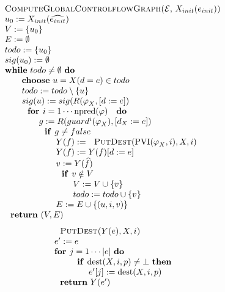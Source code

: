 \begin{equation*}
\begin{tabular}{l}
\textsc{ComputeGlobalControlflowGraph(}$\mathcal{E}$, $X_{init}(e_{init})$%
\textsc{)} \\ 
$u_{0}:=X_{init}(\widehat{e_{init}})$ \\ 
$V:=\{u_{0}\}$ \\ 
$E:=\emptyset $ \\ 
$todo:=\{u_{0}\}$ \\ 
$sig(u_{0}):=\emptyset $ \\ 
\textbf{while} $todo\neq \emptyset $ \textbf{do} \\ 
$\qquad $\textbf{choose} $u=X(d=e)\in todo$ \\ 
$\qquad todo:=todo\setminus \{u\}$ \\ 
$\qquad sig(u):=sig(R(\varphi _{X},[d:=e])$ \\ 
$\qquad \text{\textbf{for }}i=1\cdots \mathrm{npred}(\varphi )\text{ \textbf{%
do}}$ \\ 
$\qquad \qquad g:=R(guard^{i}(\varphi _{X}),[d_{X}:=e])$ \\ 
$\qquad \qquad \text{\textbf{if }}g\neq false$ \\ 
$\qquad \qquad \qquad Y(f):=\text{\textsc{PutDest}}(\mathrm{PVI}(\varphi
_{X},i),X,i)$ \\ 
$\qquad \qquad \qquad Y(f):=Y(f)[d:=e]$ \\ 
$\qquad \qquad \qquad v:=Y(\widehat{f})$ \\ 
$\qquad \qquad \qquad \text{\textbf{if }}v\notin V$ \\ 
$\qquad \qquad \qquad \qquad V:=V\cup \{v\}$ \\ 
$\qquad \qquad \qquad \qquad todo:=todo\cup \{v\}$ \\ 
$\qquad \qquad \qquad E:=E\cup \{(u,i,v)\}$ \\ 
$\text{\textbf{return} }(V,E)$%
\end{tabular}%
\end{equation*}%
\begin{equation*}
\begin{tabular}{l}
$\text{\textsc{PutDest}}$\textsc{(}$Y(e),X,i$\textsc{)} \\ 
$e^{\prime }:=e$ \\ 
\textbf{for }$j=1\cdots \left\vert e\right\vert $ \textbf{do} \\ 
$\qquad \text{\textbf{if }}\mathrm{dest}(X,i,p)\neq \bot $ \textbf{then} \\ 
$\qquad \qquad e^{\prime }[j]:=\mathrm{dest}(X,i,p)$ \\ 
$\text{\textbf{return} }Y(e^{\prime })$%
\end{tabular}%
\end{equation*}%
\newpage

